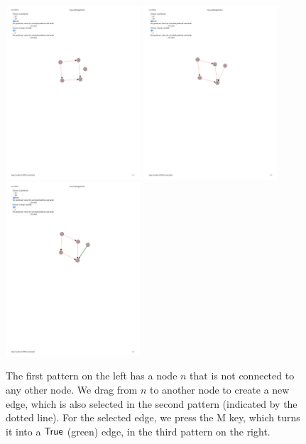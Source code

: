\begin{figure}
  \centering
  \includegraphics[width=5cm]{fig/edges1.pdf}
  \includegraphics[width=5cm]{fig/edges2.pdf}
  \includegraphics[width=5cm]{fig/edges3.pdf}
  \caption{The first pattern on the left has a node $n$ that is not connected to any other node. We drag from $n$ to another node to create a new edge, which is also selected in the second pattern (indicated by the dotted line). For the selected edge, we press the M key, which turns it into a $\mathsf{True}$ (green) edge, in the third pattern on the right.}
  \label{fig:modifying-edges}
\end{figure}

